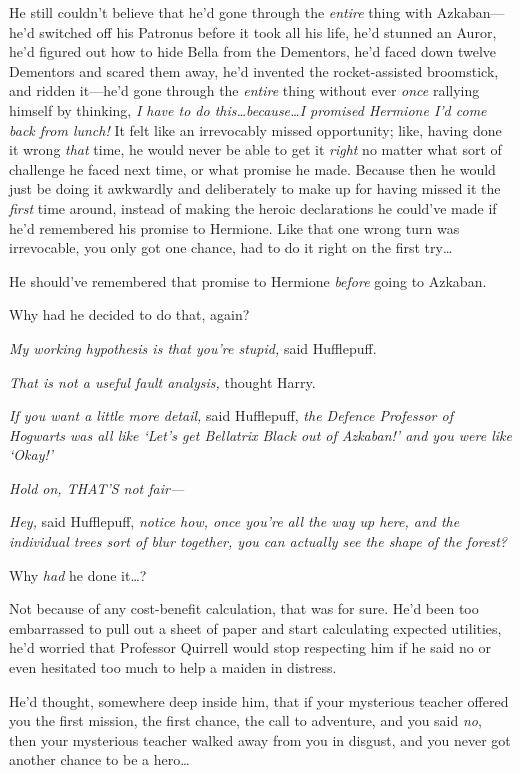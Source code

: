 He still couldn't believe that he'd gone through the \emph{entire} thing with
Azkaban—he'd switched off his Patronus before it took all his life, he'd
stunned an Auror, he'd figured out how to hide Bella from the Dementors, he'd
faced down twelve Dementors and scared them away, he'd invented the
rocket-assisted broomstick, and ridden it—he'd gone through the \emph{entire}
thing without ever \emph{once} rallying himself by thinking, \emph{I have to do
this…because…I promised Hermione I'd come back from lunch!} It
felt like an irrevocably missed opportunity; like, having done it wrong
\emph{that} time, he would never be able to get it \emph{right} no matter what
sort of challenge he faced next time, or what promise he made. Because then he
would just be doing it awkwardly and deliberately to make up for having missed
it the \emph{first} time around, instead of making the heroic declarations he
could've made if he'd remembered his promise to Hermione. Like that one wrong
turn was irrevocable, you only got one chance, had to do it right on the first
try…

He should've remembered that promise to Hermione \emph{before} going to Azkaban.

Why had he decided to do that, again?

\emph{My working hypothesis is that you're stupid,} said Hufflepuff.

\emph{That is not a useful fault analysis,} thought Harry.

\emph{If you want a little more detail,} said Hufflepuff, \emph{the Defence
Professor of Hogwarts was all like `Let's get Bellatrix Black out of Azkaban!'
and you were like `Okay!'}

\emph{Hold on, THAT'S not fair—}

\emph{Hey,} said Hufflepuff, \emph{notice how, once you're all the way up here,
and the individual trees sort of blur together, you can actually see the shape
of the forest?}

Why \emph{had} he done it…?

Not because of any cost-benefit calculation, that was for sure. He'd been too
embarrassed to pull out a sheet of paper and start calculating expected
utilities, he'd worried that Professor Quirrell would stop respecting him if he
said no or even hesitated too much to help a maiden in distress.

He'd thought, somewhere deep inside him, that if your mysterious teacher
offered you the first mission, the first chance, the call to adventure, and you
said \emph{no}, then your mysterious teacher walked away from you in disgust,
and you never got another chance to be a hero…

